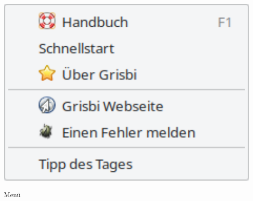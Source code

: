 \begin{minipage}{.3\linewidth}
\centering						%
\includegraphics[width=1\textwidth]{image/screenshot/home_menubar_help}
\vspace{-15pt}					%
\captionsetup{
type=figure,%
name=Abb.,%
labelsep=newline}			%
\caption{Menü }	%
\label{home_menubar_help}
\end{minipage} 
\footnotetext{\urlGrisbi{}}	%
